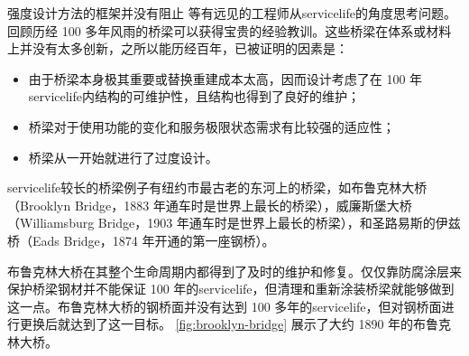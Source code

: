 强度设计方法的框架并没有阻止  等有远见的工程师从\gls*{servicelife}的角度思考问题。回顾历经 100 多年风雨的桥梁可以获得宝贵的经验教训。这些桥梁在体系或材料上并没有太多创新，之所以能历经百年，已被证明的因素是：
\begin{itemize}
  \item 由于桥梁本身极其重要或替换重建成本太高，因而设计考虑了在 100 年\gls{servicelife}内结构的可维护性，且结构也得到了良好的维护；
  \item 桥梁对于使用功能的变化和服务极限状态需求有比较强的适应性；
  \item 桥梁从一开始就进行了过度设计。
\end{itemize}

\gls*{servicelife}较长的桥梁例子有纽约市最古老的东河上的桥梁，如布鲁克林大桥（Brooklyn Bridge，1883 年通车时是世界上最长的桥梁），威廉斯堡大桥（Williamsburg Bridge，1903 年通车时是世界上最长的桥梁），和圣路易斯的伊兹桥（Eads Bridge，1874 年开通的第一座钢桥）。

布鲁克林大桥在其整个生命周期内都得到了及时的维护和修复。仅仅靠防腐涂层来保护桥梁钢材并不能保证 100 年的\gls*{servicelife}，但清理和重新涂装桥梁就能够做到这一点。布鲁克林大桥的钢桥面并没有达到 100 多年的\gls*{servicelife}，但对钢桥面进行更换后就达到了这一目标。 \cref{fig:brooklyn-bridge} 展示了大约 1890 年的布鲁克林大桥。

